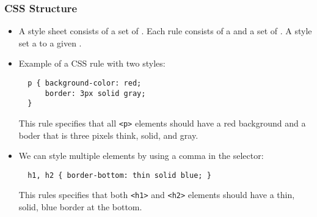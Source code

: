 \documentclass[dvipsnames,handout]{beamer}
\begin{document}
\begin{frame}[fragile=singleslide]
  \frametitle{CSS Structure}
  
  \begin{itemize}
  \item A style sheet consists of a set of .  Each rule
    consists of a  and a set of . A
    style set a  to a given .

  \item Example of a CSS rule with two styles:
    \begin{small}
\begin{verbatim}
  p { background-color: red;
      border: 3px solid gray;
  }
\end{verbatim}
        This rule specifies that all \texttt{<p>} elements should have
        a red background and a boder that is three pixels think,
        solid, and gray. 
      \end{small}

    \item We can style multiple elements by using a comma in the selector:
      \begin{small}
\begin{verbatim}
  h1, h2 { border-bottom: thin solid blue; }
\end{verbatim}
        This rules specifies that both \texttt{<h1>} and \texttt{<h2>}
        elements should have a thin, solid, blue border at the bottom.
      \end{small}
  \end{itemize}

\end{frame}
\end{document}
